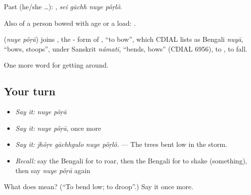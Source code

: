 Past (he/she …):    , \emph{sei gāchh nuye pôṛlô}.

Also of a person bowed with age or a load:    .

\begin{cousinweb}
\textbf{ } (\emph{nuye pôṛā}) joins , the - form of , \textquotedblleft{}to bow\textquotedblright{}, which CDIAL lists as Bengali \emph{nuyā}, \textquotedblleft{}bows, stoops\textquotedblright{}, under Sanskrit \emph{námati}, \textquotedblleft{}bends, bows\textquotedblright{} (CDIAL 6956), to , to fall.
\end{cousinweb}

\begin{grammarlens}[title={What you've built}]
One more word for getting around.
\end{grammarlens}

\subsection*{Your turn}
\begin{itemize}
\raggedright
  \item \emph{Say it:} \emph{nuye pôṛā}
  \item \emph{Say it:} \emph{nuye pôṛā}, once more
  \item \emph{Say it:} \emph{jhôṛe gāchhgulo nuye pôṛlô.} — The trees bent low in the storm.
  \item \emph{Recall:} say the Bengali for to roar, then the Bengali for to shake (something), then say \emph{nuye pôṛā} again
\end{itemize}

\begin{tcolorbox}[breakable,colback=teal!4,colframe=teal!35!black,title={Before you move on}]
What does   mean? (\textquotedblleft{}To bend low; to droop\textquotedblright{}.) Say it once more.
\end{tcolorbox}
